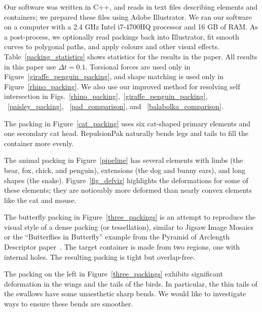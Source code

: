 Our software was written in C++, and reads in text files describing
elements and containers; we prepared these files using
Adobe Illustrator.  We ran
our software on a computer with a 2.4 GHz Intel i7-4700HQ processor
and 16 GB of RAM.  As a post-process, we optionally read packings
back into Illustrator, fit smooth curves to polygonal paths, and
apply colours and other visual effects.  Table~\ref{packing_statistics}
shows statistics for the results in the paper.  All results in this
paper use $\Delta t = 0.1$.
Torsional forces are used only in Figure~\ref{giraffe_penguin_packing},
and shape matching is used only in Figure~\ref{rhino_packing}.
We also use our improved method for resolving self intersection in
Figs.~\ref{rhino_packing},~\ref{giraffe_penguin_packing},
~\ref{paisley_packing},
~\ref{pad_comparison}, and
~\ref{balabolka_comparison}.



The packing in Figure~\ref{cat_packing} 
uses six cat-shaped primary elements and one secondary cat head.
RepulsionPak naturally bends legs and tails to fill the container more evenly.

The animal packing in Figure~\ref{pipeline} 
has several elements with limbs (the bear, fox, chick, and penguin),  
extensions (the dog and bunny ears), and long shapes (the snake).
Figure~\ref{fig_defviz} highlights the deformations for some of these elements;
they are noticeably more deformed 
than nearly convex elements like the cat and mouse.


The butterfly packing in Figure~\ref{three_packings} is an attempt to reproduce 
the visual style of a 
dense packing (or tessellation), similar to Jigsaw Image Mosaics~\cite{Kim2002}
or the ``Butterflies in Butterfly'' example from the
Pyramid of Arclength Descriptor paper~\cite[Figure 21]{Kwan2016}. 
The target container is made from two regions,
one with internal holes.  The resulting packing is tight but overlap-free.

The packing on the left in Figure~\ref{three_packings}
exhibits significant deformation in the wings and the tails of the birds.
In particular, the thin tails of the swallows have some unaesthetic
sharp bends.  We would like to investigate ways to ensure these bends are
smoother.

